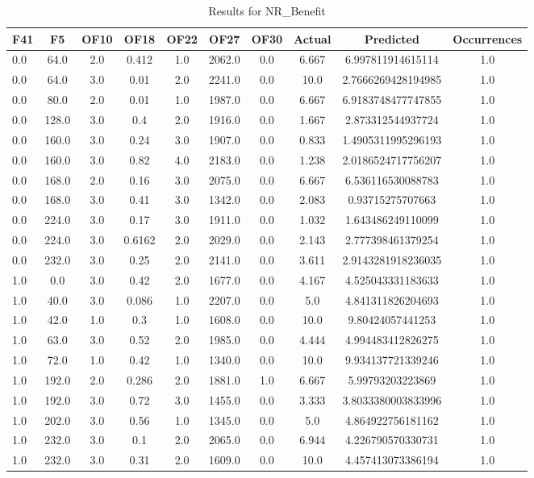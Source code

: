 \clearpage
\begin{table}[htbp]
\centering
\begin{tabular}{|l|c|c|c|c|c|c|c|c|c|}
\hline
F41 & F5 & OF10 & OF18 & OF22 & OF27 & OF30 & Actual & Predicted & Occurrences \\
\hline
0.0 & 64.0 & 2.0 & 0.412 & 1.0 & 2062.0 & 0.0 & 6.667 & 6.997811914615114 & 1.0 \\
0.0 & 64.0 & 3.0 & 0.01 & 2.0 & 2241.0 & 0.0 & 10.0 & 2.7666269428194985 & 1.0 \\
0.0 & 80.0 & 2.0 & 0.01 & 1.0 & 1987.0 & 0.0 & 6.667 & 6.9183748477747855 & 1.0 \\
0.0 & 128.0 & 3.0 & 0.4 & 2.0 & 1916.0 & 0.0 & 1.667 & 2.873312544937724 & 1.0 \\
0.0 & 160.0 & 3.0 & 0.24 & 3.0 & 1907.0 & 0.0 & 0.833 & 1.4905311995296193 & 1.0 \\
0.0 & 160.0 & 3.0 & 0.82 & 4.0 & 2183.0 & 0.0 & 1.238 & 2.0186524717756207 & 1.0 \\
0.0 & 168.0 & 2.0 & 0.16 & 3.0 & 2075.0 & 0.0 & 6.667 & 6.536116530088783 & 1.0 \\
0.0 & 168.0 & 3.0 & 0.41 & 3.0 & 1342.0 & 0.0 & 2.083 & 0.93715275707663 & 1.0 \\
0.0 & 224.0 & 3.0 & 0.17 & 3.0 & 1911.0 & 0.0 & 1.032 & 1.643486249110099 & 1.0 \\
0.0 & 224.0 & 3.0 & 0.6162 & 2.0 & 2029.0 & 0.0 & 2.143 & 2.777398461379254 & 1.0 \\
0.0 & 232.0 & 3.0 & 0.25 & 2.0 & 2141.0 & 0.0 & 3.611 & 2.9143281918236035 & 1.0 \\
1.0 & 0.0 & 3.0 & 0.42 & 2.0 & 1677.0 & 0.0 & 4.167 & 4.525043331183633 & 1.0 \\
1.0 & 40.0 & 3.0 & 0.086 & 1.0 & 2207.0 & 0.0 & 5.0 & 4.841311826204693 & 1.0 \\
1.0 & 42.0 & 1.0 & 0.3 & 1.0 & 1608.0 & 0.0 & 10.0 & 9.80424057441253 & 1.0 \\
1.0 & 63.0 & 3.0 & 0.52 & 2.0 & 1985.0 & 0.0 & 4.444 & 4.994483412826275 & 1.0 \\
1.0 & 72.0 & 1.0 & 0.42 & 1.0 & 1340.0 & 0.0 & 10.0 & 9.934137721339246 & 1.0 \\
1.0 & 192.0 & 2.0 & 0.286 & 2.0 & 1881.0 & 1.0 & 6.667 & 5.99793203223869 & 1.0 \\
1.0 & 192.0 & 3.0 & 0.72 & 3.0 & 1455.0 & 0.0 & 3.333 & 3.8033380003833996 & 1.0 \\
1.0 & 202.0 & 3.0 & 0.56 & 1.0 & 1345.0 & 0.0 & 5.0 & 4.864922756181162 & 1.0 \\
1.0 & 232.0 & 3.0 & 0.1 & 2.0 & 2065.0 & 0.0 & 6.944 & 4.226790570330731 & 1.0 \\
1.0 & 232.0 & 3.0 & 0.31 & 2.0 & 1609.0 & 0.0 & 10.0 & 4.457413073386194 & 1.0 \\
\hline
\end{tabular}
\caption{Results for NR_Benefit}
\label{tab:NR_Benefit_results}
\end{table}
